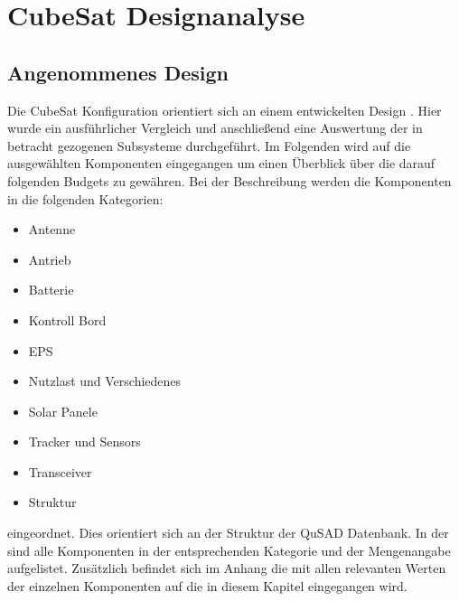 		\section{CubeSat Designanalyse}
				
				\subsection{Angenommenes Design}
				
				Die CubeSat Konfiguration orientiert sich an einem entwickelten Design \cite{Lettau.}. Hier wurde ein ausführlicher Vergleich und anschließend eine Auswertung der in betracht gezogenen Subsysteme durchgeführt. Im Folgenden wird auf die ausgewählten Komponenten eingegangen um einen Überblick über die darauf folgenden Budgets zu gewähren. Bei der Beschreibung werden die Komponenten in die folgenden Kategorien: 
				\begin{itemize}
					\item Antenne
					\item Antrieb
					\item Batterie
					\item Kontroll Bord
					\item EPS
					\item Nutzlast und Verschiedenes 
					\item Solar Panele
					\item Tracker und Sensors
					\item Transceiver
					\item Struktur
				\end{itemize}
eingeordnet. Dies orientiert sich an der Struktur der QuSAD Datenbank. In der  sind alle Komponenten in der entsprechenden Kategorie und der Mengenangabe aufgelistet. Zusätzlich befindet sich im Anhang die  mit allen relevanten Werten der einzelnen Komponenten auf die in diesem Kapitel eingegangen wird.
